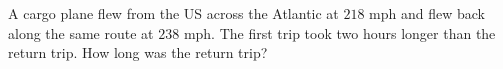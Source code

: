 A cargo plane flew from the US across the Atlantic at $218$ mph and flew back along the same route at $238$ mph. The first trip took two hours longer than the return trip. How long was the return trip?
